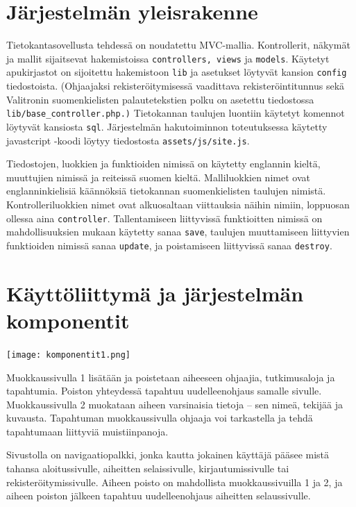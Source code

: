 \documentclass[11pt,a4paper,finnish,oneside]{article}
\begin{document}
\section{Järjestelmän yleisrakenne}

\begin{par}
Tietokantasovellusta tehdessä on noudatettu MVC-mallia. Kontrollerit, näkymät ja mallit sijaitsevat hakemistoissa \verb|controllers, views| ja \verb|models|. Käytetyt apukirjastot on sijoitettu hakemistoon \verb|lib| ja asetukset löytyvät kansion \verb|config| tiedostoista. (Ohjaajaksi rekisteröitymisessä vaadittava rekisteröintitunnus sekä Valitronin suomenkielisten palautetekstien polku on asetettu tiedostossa \verb|lib/base_controller.php.)| Tietokannan taulujen luontiin käytetyt komennot löytyvät kansiosta \verb|sql|. Järjestelmän hakutoiminnon toteutuksessa käytetty javastcript -koodi löytyy tiedostosta \verb|assets/js/site.js|.
\end{par}\vspace{1em}
\begin{par}
Tiedostojen, luokkien ja funktioiden nimissä on käytetty englannin kieltä, muuttujien nimissä ja reiteissä suomen kieltä. Malliluokkien nimet ovat englanninkielisiä käännöksiä tietokannan suomenkielisten taulujen nimistä. Kontrolleriluokkien nimet ovat alkuosaltaan viittauksia näihin nimiin, loppuosan ollessa aina \verb|controller|. Tallentamiseen liittyvissä funktioitten nimissä on mahdollisuuksien mukaan käytetty sanaa \verb|save|, taulujen muuttamiseen liittyvien funktioiden nimissä sanaa \verb|update|, ja poistamiseen liittyvissä sanaa \verb|destroy|.  
\end{par}\vspace{1em}

\section{Käyttöliittymä ja järjestelmän komponentit}

\texttt{[image: komponentit1.png]}
\vspace{2em}
\begin{par}
Muokkaussivulla 1 lisätään ja poistetaan aiheeseen ohjaajia, tutkimusaloja ja tapahtumia. Poiston yhteydessä tapahtuu uudelleenohjaus samalle sivulle. Muokkaussivulla 2 muokataan aiheen varsinaisia tietoja -- sen nimeä, tekijää ja kuvausta. Tapahtuman muokkaussivulla ohjaaja voi tarkastella ja tehdä tapahtumaan liittyviä muistiinpanoja.\end{par}
 \begin{par}\vspace{1em}
Sivustolla on navigaatiopalkki, jonka kautta jokainen käyttäjä pääsee mistä tahansa aloitussivulle, aiheitten selaissivulle, kirjautumissivulle tai rekisteröitymissivulle. Aiheen poisto on mahdollista muokkaussivuilla 1 ja 2, ja aiheen poiston jälkeen tapahtuu uudelleenohjaus aiheitten selaussivulle.
\end{par}
\end{document}
